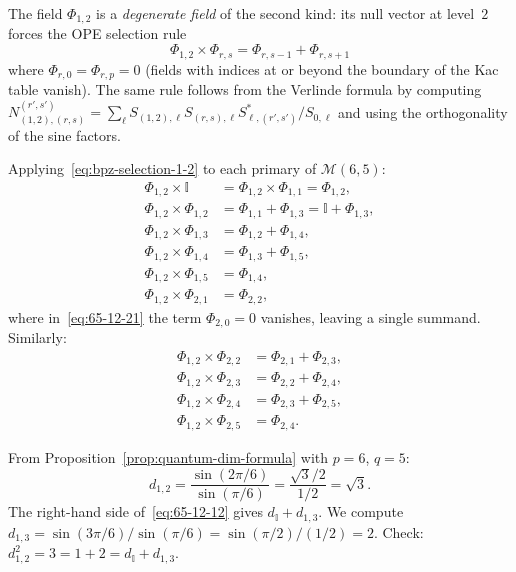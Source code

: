 \begin{computation}\label{comp:fusion-phi12-6-5}
The field $\Phi_{1,2}$ is a \emph{degenerate field} of the second kind: its
null vector at level~$2$ forces the OPE selection rule
\begin{equation}\label{eq:bpz-selection-1-2}
\Phi_{1,2} \times \Phi_{r,s} = \Phi_{r,s-1} + \Phi_{r,s+1}
\end{equation}
where $\Phi_{r,0} = \Phi_{r,p} = 0$ (fields with indices at or beyond the
boundary of the Kac table vanish). The same rule follows from the Verlinde
formula by computing
$N_{(1,2),(r,s)}^{(r',s')} = \sum_\ell S_{(1,2),\ell}S_{(r,s),\ell}S_{\ell,(r',s')}^*/S_{0,\ell}$
and using the orthogonality of the sine factors.

Applying~\eqref{eq:bpz-selection-1-2} to each primary of $\mathcal{M}(6,5)$:
\begin{align}
\Phi_{1,2} \times \mathbb{I} &= \Phi_{1,2} \times \Phi_{1,1} = \Phi_{1,2}, \label{eq:65-12-11}\\
\Phi_{1,2} \times \Phi_{1,2} &= \Phi_{1,1} + \Phi_{1,3} = \mathbb{I} + \Phi_{1,3}, \label{eq:65-12-12}\\
\Phi_{1,2} \times \Phi_{1,3} &= \Phi_{1,2} + \Phi_{1,4}, \label{eq:65-12-13}\\
\Phi_{1,2} \times \Phi_{1,4} &= \Phi_{1,3} + \Phi_{1,5}, \label{eq:65-12-14}\\
\Phi_{1,2} \times \Phi_{1,5} &= \Phi_{1,4}, \label{eq:65-12-15}\\
\Phi_{1,2} \times \Phi_{2,1} &= \Phi_{2,2}, \label{eq:65-12-21}
\end{align}
where in~\eqref{eq:65-12-21} the term $\Phi_{2,0} = 0$ vanishes, leaving a
single summand. Similarly:
\begin{align}
\Phi_{1,2} \times \Phi_{2,2} &= \Phi_{2,1} + \Phi_{2,3}, \label{eq:65-12-22}\\
\Phi_{1,2} \times \Phi_{2,3} &= \Phi_{2,2} + \Phi_{2,4}, \label{eq:65-12-23}\\
\Phi_{1,2} \times \Phi_{2,4} &= \Phi_{2,3} + \Phi_{2,5}, \label{eq:65-12-24}\\
\Phi_{1,2} \times \Phi_{2,5} &= \Phi_{2,4}. \label{eq:65-12-25}
\end{align}
\end{computation}

\begin{verification}[$\Phi_{1,2}\times\Phi_{1,2} = \mathbb{I} + \Phi_{1,3}$ via quantum dimensions]\label{verif:65-12-squared}
From Proposition~\ref{prop:quantum-dim-formula} with $p=6$, $q=5$:
\begin{equation}
d_{1,2}
= \frac{\sin(2\pi/6)}{\sin(\pi/6)}
= \frac{\sqrt{3}/2}{1/2} = \sqrt{3}.
\end{equation}
The right-hand side of~\eqref{eq:65-12-12} gives $d_{\mathbb{I}} + d_{1,3}$.
We compute
$d_{1,3} = \sin(3\pi/6)/\sin(\pi/6) = \sin(\pi/2)/(1/2) = 2$.
Check: $d_{1,2}^2 = 3 = 1 + 2 = d_{\mathbb{I}} + d_{1,3}$.
\end{verification}

